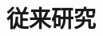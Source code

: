 \documentclass[submit]{ipsj}
\begin{document}
\begin{table}[t]
{\begin{tabular}{c|c|cccccccc}
\end{tabular}
}
 \vspace{-5mm}
\end{table}


\section{従来研究}\label{sec:relate}

\end{document}
